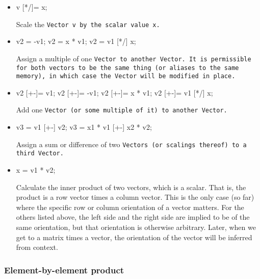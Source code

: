 \begin{itemize}

\item
\begin{tmvcode}
v [*/]= x;
\end{tmvcode}
Scale the \tt{Vector v} by the scalar value \tt{x}.

\item
\begin{tmvcode}
v2 = -v1;
v2 = x * v1;
v2 = v1 [*/] x;
\end{tmvcode}
Assign a multiple of one \tt{Vector} to another \tt{Vector}.  It is permissible for both vectors to be the same thing (or aliases to the same memory), in which case the \tt{Vector} will be modified in place.

\item
\begin{tmvcode}
v2 [+-]= v1;
v2 [+-]= -v1;
v2 [+-]= x * v1;
v2 [+-]= v1 [*/] x;
\end{tmvcode}
Add one \tt{Vector} (or some multiple of it) to another \tt{Vector}.

\item
\begin{tmvcode}
v3 = v1 [+-] v2;
v3 = x1 * v1 [+-] x2 * v2;
\end{tmvcode}
Assign a sum or difference of two \tt{Vectors} (or scalings thereof) to a third \tt{Vector}.

\item
\begin{tmvcode}
x = v1 * v2;
\end{tmvcode}
Calculate the inner product of two vectors, which is a scalar.  That is, the product
is a row vector times a column vector.  
This is the only case (so far)
where the specific row or column orientation of a vector matters.  For the others
listed above, the left side and the right side are implied to be of the same orientation, but
that orientation is otherwise arbitrary.
Later, when we get to a matrix times a vector, the orientation 
of the vector will be inferred from context.

\end{itemize}

\subsubsection{Element-by-element product}
\label{VectorElementProd}

